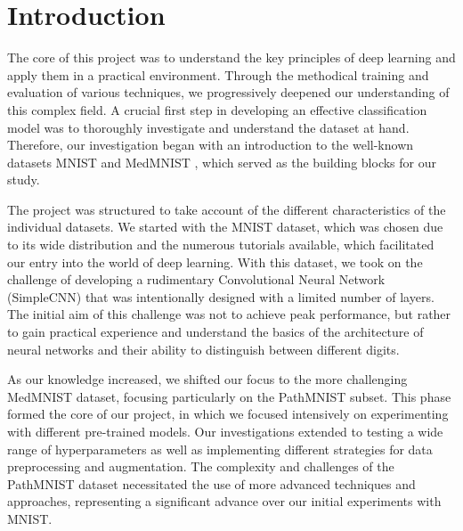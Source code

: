 \section{Introduction}\label{intro}

The core of this project was to understand the key principles of deep learning and apply them in a practical environment. Through the methodical training and evaluation of various techniques, we progressively deepened our understanding of this complex field. A crucial first step in developing an effective classification model was to thoroughly investigate and understand the dataset at hand. Therefore, our investigation began with an introduction to the well-known datasets MNIST \citep{deng2012mnist} and MedMNIST \citep{medmnistv1}, which served as the building blocks for our study.

The project was structured to take account of the different characteristics of the individual datasets. We started with the MNIST dataset, which was chosen due to its wide distribution and the numerous tutorials available, which facilitated our entry into the world of deep learning. With this dataset, we took on the challenge of developing a rudimentary Convolutional Neural Network (SimpleCNN) that was intentionally designed with a limited number of layers. The initial aim of this challenge was not to achieve peak performance, but rather to gain practical experience and understand the basics of the architecture of neural networks and their ability to distinguish between different digits.

As our knowledge increased, we shifted our focus to the more challenging MedMNIST dataset, focusing particularly on the PathMNIST subset. This phase formed the core of our project, in which we focused intensively on experimenting with different pre-trained models. Our investigations extended to testing a wide range of hyperparameters as well as implementing different strategies for data preprocessing and augmentation. The complexity and challenges of the PathMNIST dataset necessitated the use of more advanced techniques and approaches, representing a significant advance over our initial experiments with MNIST.\@


